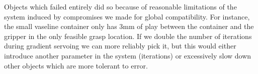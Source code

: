 \documentclass{article}
\begin{document}
Objects which failed entirely did so because of reasonable limitations of the
system induced by compromises we made for global compatibility. For instance,
the small vaseline container only has 3mm of play between the container and the
gripper in the only feasible grasp location. If we double the number of iterations
during gradient servoing we can more reliably pick it, but this would either
introduce another parameter in the system (iterations) or excessively slow down
other objects which are more tolerant to error.


{\tiny


}
\end{document}
